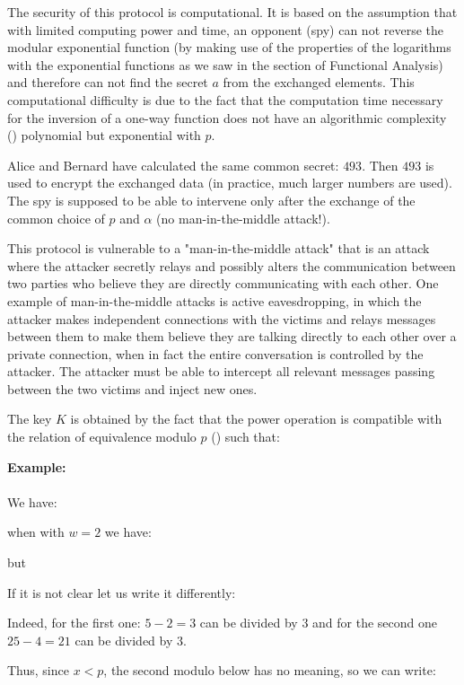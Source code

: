 	The security of this protocol is computational. It is based on the assumption that with limited computing power and time, an opponent (spy) can not reverse the modular exponential function (by making use of the properties of the logarithms with the exponential functions as we saw in the section of Functional Analysis) and therefore can not find the secret $a$ from the exchanged elements. This computational difficulty is due to the fact that the computation time necessary for the inversion of a one-way function does not have an algorithmic complexity () polynomial but exponential with $p$.
	
	Alice and Bernard have calculated the same common secret: $493$. Then $493$ is used to encrypt the exchanged data (in practice, much larger numbers are used). The spy is supposed to be able to intervene only after the exchange of the common choice of $p$ and $\alpha$ (no man-in-the-middle attack!).

	\begin{tcolorbox}[title=Remark,colframe=black,arc=10pt]
	This protocol is vulnerable to a "man-in-the-middle attack" that is an attack where the attacker secretly relays and possibly alters the communication between two parties who believe they are directly communicating with each other. One example of man-in-the-middle attacks is active eavesdropping, in which the attacker makes independent connections with the victims and relays messages between them to make them believe they are talking directly to each other over a private connection, when in fact the entire conversation is controlled by the attacker. The attacker must be able to intercept all relevant messages passing between the two victims and inject new ones.
	\end{tcolorbox}
	The key $K$ is obtained by the fact that the power operation is compatible with the relation of equivalence modulo $p$ () such that:
	
	\begin{tcolorbox}[colframe=black,colback=white,sharp corners]
	\textbf{{\Large {}}Example:}\\\\
	We have:
	
	when with $w=2$ we have:
	
	but
	
	If it is not clear let us write it differently:
	
	Indeed, for the first one: $5-2=3$ can be divided by $3$ and for the second one $25-4=21$ can be divided by $3$.
	\end{tcolorbox}
	Thus, since $x<p$, the second modulo below has no meaning, so we can write:
	
